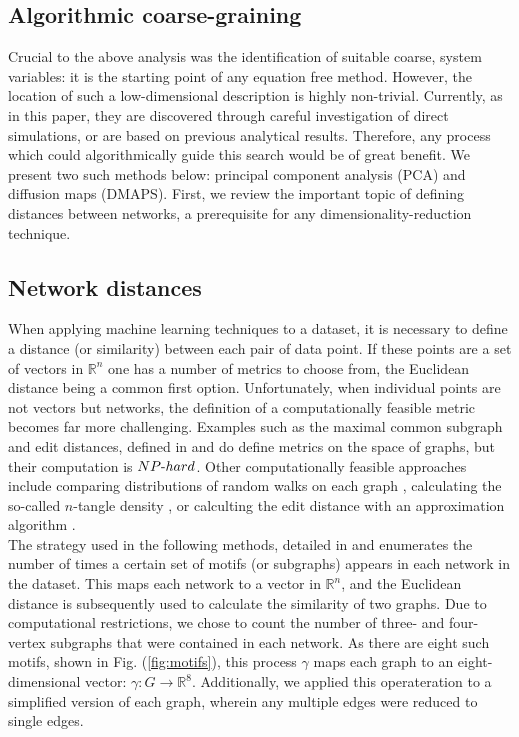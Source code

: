 \documentclass[epjST, final]{svjour}
\begin{document}
\begin{onehalfspace}
\section{Algorithmic coarse-graining}
\label{sec:dr}
Crucial to the above analysis was the identification of suitable coarse, system variables: it is the starting point of any equation free method. However, the location of such a low-dimensional description is highly non-trivial. Currently, as in this paper, they are discovered through careful investigation of direct simulations, or are based on previous analytical results. Therefore, any process which could algorithmically guide this search would be of great benefit. We present two such methods below: principal component analysis (PCA) and diffusion maps (DMAPS). First, we review the important topic of defining distances between networks, a prerequisite for any dimensionality-reduction technique.

\subsection{Network distances}

When applying machine learning techniques to a dataset, it is
necessary to define a distance (or similarity) between each pair of
data point. If these points are a set of vectors in $\mathbb{R}^n$ one
has a number of metrics to choose from, the Euclidean distance being a
common first option. Unfortunately, when individual points are not
vectors but networks, the definition of a computationally feasible
metric becomes far more challenging. Examples such as the maximal
common subgraph and edit distances, defined in \cite{bunke_graph_1998}
and \cite{gao_survey_2010} do define metrics on the space of graphs,
but their computation is $NP\textnormal{-}hard$. Other computationally
feasible approaches include comparing distributions of random
walks on each graph \cite{vishwanathan_graph_2010}, calculating the so-called
$n$-tangle density \cite{gallos_revealing_2014}, or calculting the edit distance
with an approximation algorithm \cite{riesen_approximate_2009,zeng_comparing_2009}.  \\

The strategy used in the following methods, detailed in
\cite{rajendran_analysis_2013} and \cite{xiao_structure-based_2008}
enumerates the number of times a certain set of motifs (or subgraphs)
appears in each network in the dataset. This maps each network to a
vector in $\mathbb{R}^n$, and the Euclidean distance is subsequently
used to calculate the similarity of two graphs. Due to computational
restrictions, we chose to count the number of three- and four-vertex
subgraphs that were contained in each network. As there are eight such
motifs, shown in Fig. (\ref{fig:motifs}), this process $\gamma$ maps
each graph to an eight-dimensional vector:
$\gamma : G \rightarrow \mathbb{R}^8$. Additionally, we applied this
operateration to a simplified version of each graph, wherein any
multiple edges were reduced to single edges.


\end{onehalfspace}
\end{document}
